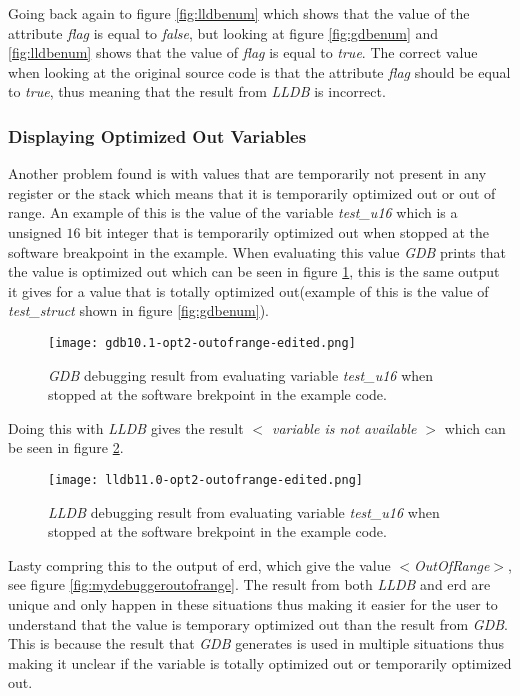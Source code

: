 Going back again to figure \ref{fig:lldbenum} which shows that the value of the attribute \emph{flag} is equal to \emph{false}, but looking at figure \ref{fig:gdbenum} and \ref{fig:lldbenum} shows that the value of \emph{flag} is equal to \emph{true}.
The correct value when looking at the original source code is that the attribute \emph{flag} should be equal to \emph{true}, thus meaning that the result from \emph{LLDB} is incorrect.



\subsubsection{Displaying Optimized Out Variables}
Another problem found is with values that are temporarily not present in any register or the stack which means that it is temporarily optimized out or out of range.
An example of this is the value of the variable \emph{test\_u16} which is a unsigned $16$ bit integer that is temporarily optimized out when stopped at the software breakpoint in the example.
When evaluating this value \emph{GDB} prints that the value is optimized out which can be seen in figure \ref{fig:gdboutofrange}, this is the same output it gives for a value that is totally optimized out(example of this is the value of \emph{test\_struct} shown in figure \ref{fig:gdbenum}).


\begin{figure}[h]
	\centering
	\texttt{[image: gdb10.1-opt2-outofrange-edited.png]}
	\caption{\emph{GDB} debugging result from evaluating variable \emph{test\_u16} when stopped at the software brekpoint in the example code.}
    	\label{fig:gdboutofrange}
\end{figure}


Doing this with \emph{LLDB} gives the result  \emph{$<$ variable is not available $>$} which can be seen in figure \ref{fig:lldboutofrange}.


\begin{figure}[h]
	\centering
	\texttt{[image: lldb11.0-opt2-outofrange-edited.png]}
	\caption{\emph{LLDB} debugging result from evaluating variable \emph{test\_u16} when stopped at the software brekpoint in the example code.}
	\label{fig:lldboutofrange}
\end{figure}


Lasty compring this to the output of \gls{erd}, which give the value \emph{$<$OutOfRange$>$}, see figure \ref{fig:mydebuggeroutofrange}.
The result from both \emph{LLDB} and \gls{erd} are unique and only happen in these situations thus making it easier for the user to understand that the value is temporary optimized out than the result from \emph{GDB}.
This is because the result that \emph{GDB} generates is used in multiple situations thus making it unclear if the variable is totally optimized out or temporarily optimized out.


